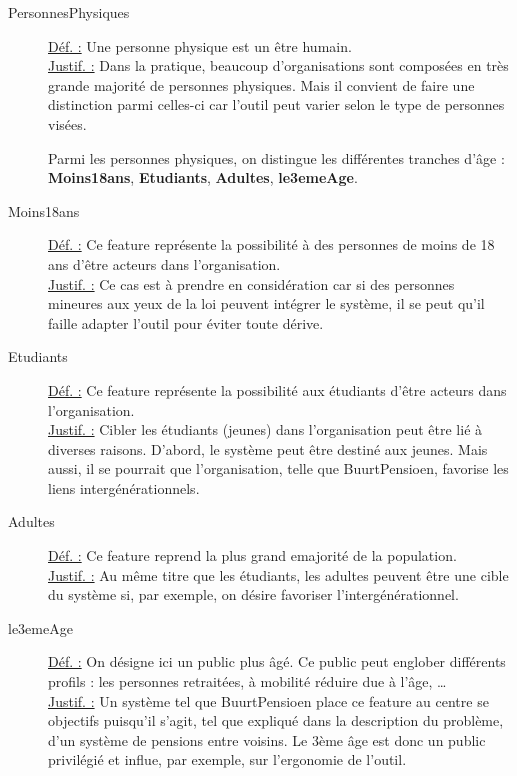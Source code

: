 \begin{description}
\item [PersonnesPhysiques]
\underline{Déf. :}  Une personne physique est un être humain.
\\ \underline{Justif. :}  Dans la pratique,  beaucoup d'organisations sont composées en très grande majorité de personnes physiques.  Mais il convient de faire une distinction parmi celles-ci car  l'outil peut varier  selon le type de personnes visées.
\newline

Parmi les personnes physiques,  on distingue les différentes tranches d'âge : \textbf{Moins18ans}, \textbf{Etudiants}, \textbf{Adultes}, \textbf{le3emeAge}.


\item [Moins18ans]
\underline{Déf. :}  Ce feature représente la possibilité à des personnes de moins de 18 ans d'être acteurs dans l'organisation.
\\ \underline{Justif. :}  Ce cas est à prendre en considération car si des personnes mineures aux yeux de la loi peuvent intégrer le système,   il se peut qu'il faille adapter l'outil pour éviter toute dérive.
\newline

\item [Etudiants]
\underline{Déf. :}  Ce feature représente la possibilité aux étudiants d'être acteurs dans l'organisation.
\\ \underline{Justif. :}  Cibler les étudiants (jeunes) dans l'organisation peut être lié à diverses raisons.  D'abord,  le système peut être destiné aux jeunes.  Mais aussi,  il se pourrait que l'organisation,  telle que BuurtPensioen,  favorise les liens intergénérationnels.
\newline

\item [Adultes]
\underline{Déf. :}  Ce feature reprend la plus grand emajorité de la population.
\\ \underline{Justif. :}  Au même titre que les étudiants,  les adultes peuvent être une cible du système si,  par exemple,  on désire favoriser l'intergénérationnel.
\newline

\item [le3emeAge]
\underline{Déf. :}   On désigne ici un public plus âgé.  Ce public peut englober différents profils : les personnes retraitées,  à mobilité réduire due à l'âge,  \dots 
\\ \underline{Justif. :}  Un système tel que BuurtPensioen place ce feature au centre se objectifs puisqu'il s'agit,  tel que expliqué dans la description du problème,  d'un système de pensions entre voisins.  Le 3ème âge est donc un public privilégié et influe,  par exemple,  sur l'ergonomie de l'outil.
\newline


\end{description}

